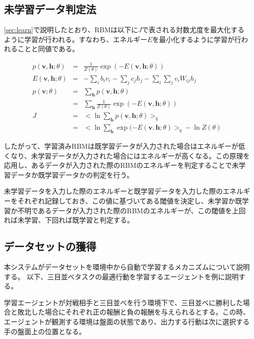 \subsection{未学習データ判定法}

\ref{sec:learn}で説明したとおり、RBMは以下に$J$で表される対数尤度を最大化するように学習が行われる。すなわち、エネルギー$E$を最小化するように学習が行われることと同値である。

\begin{eqnarray}
	p(\bm{v}, \bm{h}; \theta) & = & \frac{1}{Z(\theta)}  \exp (-E(\bm{v},\bm{h};\theta)) \nonumber \\
	E(\bm{v}, \bm{h}; \theta) & = & -\sum_i b_i v_i - \sum_j c_j h_j- \sum_i \sum_j v_i W_{ij} h_j \nonumber \\
	p(\bm{v};\theta) & = & \sum_{\bm{h}} p(\bm{v},\bm{h};\theta) \nonumber \\
			& = & \sum_{\bm{h}} \frac{1}{Z(\theta)} \exp (-E(\bm{v}, \bm{h}; \theta)) \nonumber \\
	J & = & < \ln \sum_{\bm{h}} p(\bm{v}, \bm{h}; \theta) >_q \nonumber \\
	  & = & < \ln \sum_{\bm{h}} \exp (-E(\bm{v}, \bm{h}; \theta) >_q - \ln Z(\theta) \nonumber 
\end{eqnarray}

したがって、学習済みRBMは既学習データが入力された場合はエネルギーが低くなり、未学習データが入力された場合にはエネルギーが高くなる。この原理を応用し、あるデータが入力された際のRBMのエネルギーを判定することで未学習データか既学習データかの判定を行う。

未学習データを入力した際のエネルギーと既学習データを入力した際のエネルギーをそれぞれ記録しておき、この値に基づいてある閾値を決定し、未学習か既学習か不明であるデータが入力された際のRBMのエネルギーが、この閾値を上回れば未学習、下回れば既学習と判定する。

\subsection{データセットの獲得}

本システムがデータセットを環境中から自動で学習するメカニズムについて説明する。
以下、三目並べタスクの最適行動を学習するエージェントを例に説明する。

学習エージェントが対戦相手と三目並べを行う環境下で、三目並べに勝利した場合と敗北した場合にそれぞれ正の報酬と負の報酬を与えられるとする。この時、エージェントが観測する環境は盤面の状態であり、出力する行動は次に選択する手の盤面上の位置となる。

